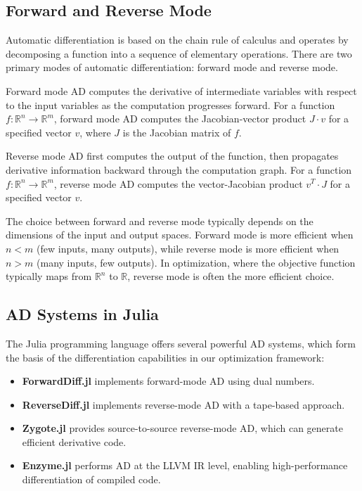 \subsection{Forward and Reverse Mode}

Automatic differentiation is based on the chain rule of calculus and operates by decomposing a function into a sequence of elementary operations. There are two primary modes of automatic differentiation: forward mode and reverse mode.

Forward mode AD computes the derivative of intermediate variables with respect to the input variables as the computation progresses forward. For a function $f: \mathbb{R}^n \rightarrow \mathbb{R}^m$, forward mode AD computes the Jacobian-vector product $J \cdot v$ for a specified vector $v$, where $J$ is the Jacobian matrix of $f$.

Reverse mode AD first computes the output of the function, then propagates derivative information backward through the computation graph. For a function $f: \mathbb{R}^n \rightarrow \mathbb{R}^m$, reverse mode AD computes the vector-Jacobian product $v^T \cdot J$ for a specified vector $v$.

The choice between forward and reverse mode typically depends on the dimensions of the input and output spaces. Forward mode is more efficient when $n < m$ (few inputs, many outputs), while reverse mode is more efficient when $n > m$ (many inputs, few outputs). In optimization, where the objective function typically maps from $\mathbb{R}^n$ to $\mathbb{R}$, reverse mode is often the more efficient choice.

\subsection{AD Systems in Julia}

The Julia programming language offers several powerful AD systems, which form the basis of the differentiation capabilities in our optimization framework:

\begin{itemize}
\item \textbf{ForwardDiff.jl} implements forward-mode AD using dual numbers.
\item \textbf{ReverseDiff.jl} implements reverse-mode AD with a tape-based approach.
\item \textbf{Zygote.jl} provides source-to-source reverse-mode AD, which can generate efficient derivative code.
\item \textbf{Enzyme.jl} performs AD at the LLVM IR level, enabling high-performance differentiation of compiled code.
\end{itemize}

